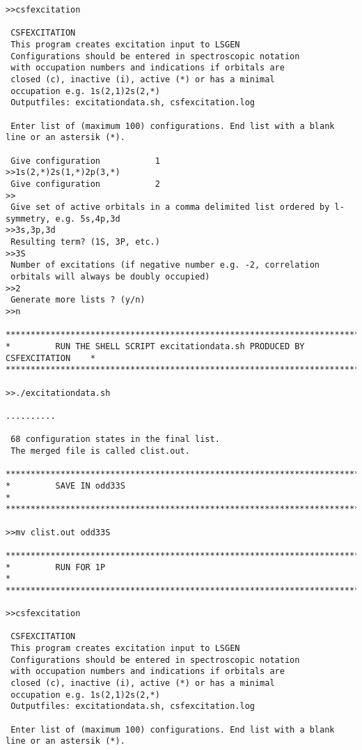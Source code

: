 \documentclass[fleqn,10pt]{book}
\begin{document}
\begin{verbatim}
>>csfexcitation

 CSFEXCITATION
 This program creates excitation input to LSGEN
 Configurations should be entered in spectroscopic notation
 with occupation numbers and indications if orbitals are
 closed (c), inactive (i), active (*) or has a minimal
 occupation e.g. 1s(2,1)2s(2,*)
 Outputfiles: excitationdata.sh, csfexcitation.log

 Enter list of (maximum 100) configurations. End list with a blank line or an astersik (*).

 Give configuration           1
>>1s(2,*)2s(1,*)2p(3,*)
 Give configuration           2
>>
 Give set of active orbitals in a comma delimited list ordered by l-symmetry, e.g. 5s,4p,3d
>>3s,3p,3d
 Resulting term? (1S, 3P, etc.)
>>3S
 Number of excitations (if negative number e.g. -2, correlation 
 orbitals will always be doubly occupied)                        
>>2
 Generate more lists ? (y/n)
>>n

*******************************************************************************
*         RUN THE SHELL SCRIPT excitationdata.sh PRODUCED BY CSFEXCITATION    *
*******************************************************************************

>>./excitationdata.sh

..........

 68 configuration states in the final list.
 The merged file is called clist.out.

*******************************************************************************
*         SAVE IN odd33S                                                     *
*******************************************************************************

>>mv clist.out odd33S

*******************************************************************************
*         RUN FOR 1P                                                          *
*******************************************************************************

>>csfexcitation

 CSFEXCITATION
 This program creates excitation input to LSGEN
 Configurations should be entered in spectroscopic notation
 with occupation numbers and indications if orbitals are
 closed (c), inactive (i), active (*) or has a minimal
 occupation e.g. 1s(2,1)2s(2,*)
 Outputfiles: excitationdata.sh, csfexcitation.log

 Enter list of (maximum 100) configurations. End list with a blank line or an astersik (*).


\end{verbatim}
\end{document}
